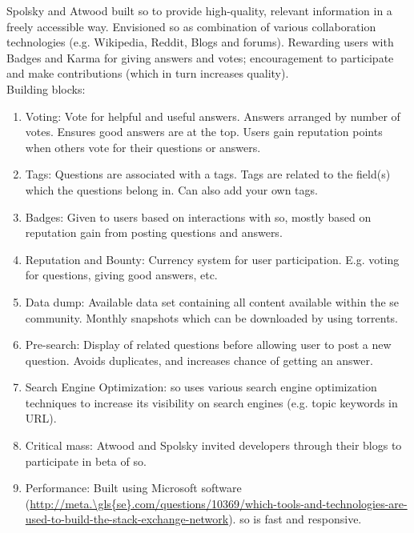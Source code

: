 Spolsky and Atwood built \gls{so} to provide high-quality, relevant information in a freely accessible way.
Envisioned \gls{so} as combination of various collaboration technologies (e.g. Wikipedia, Reddit, Blogs and forums).
Rewarding users with Badges and Karma for giving answers and votes; encouragement to participate and make contributions (which in turn increases quality). \\
Building blocks: 
\begin{enumerate}
	\item Voting: Vote for helpful and useful answers. Answers arranged by number of votes. 
	Ensures good answers are at the top. Users gain reputation points when others vote for their questions or answers.
	\item Tags: Questions are associated with a tags. Tags are related to the field(s) which the questions belong in. 
	Can also add your own tags.
	\item Badges: Given to users based on interactions with \gls{so}, mostly based on reputation gain from posting questions and answers.
	\item Reputation and Bounty: Currency system for user participation. E.g. voting for questions, giving good answers, etc.
	\item Data dump: Available data set containing all content available within the \gls{se} community. 
	Monthly snapshots which can be downloaded by using torrents.
	\item Pre-search: Display of related questions before allowing user to post a new question. 
	Avoids duplicates, and increases chance of getting an answer.
	\item Search Engine Optimization: \gls{so} uses various search engine optimization techniques to increase its visibility on search engines 
	(e.g. topic keywords in URL).
	\item Critical mass: Atwood and Spolsky invited developers through their blogs to participate in beta of \gls{so}.
	\item Performance: Built using Microsoft software 
	(\url{http://meta.\gls{se}.com/questions/10369/which-tools-and-technologies-are-used-to-build-the-stack-exchange-network}). 
	\gls{so} is fast and responsive.
\end{enumerate}
\cite{Sewak2010}




